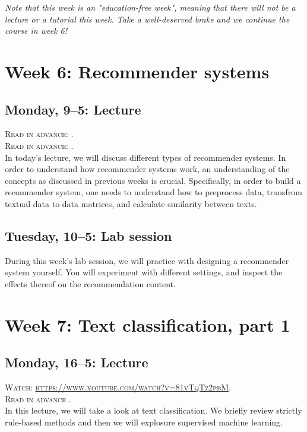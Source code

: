 \emph{Note that this week is an "education-free week", meaning that there will not be a lecture or a tutorial this week. Take a well-deserved brake and we continue the course in week 6!}

\section*{Week 6: Recommender systems}

\subsection*{Monday, 9--5: Lecture}
\textsc{ Read in advance: \cite{Moller2018}.}\\
\textsc{ Read in advance: \cite{Loecherbach2020}.}\\

In today's lecture, we will discuss different types of recommender systems. In order to understand how recommender systems work, an understanding of the concepts as discussed in previous weeks is crucial. Specifically, in order to build a recommender system, one needs to understand how to preprocess data, transfrom textual data to data matrices, and calculate similarity between texts. 

\subsection*{Tuesday, 10--5: Lab session}
During this week's lab session, we will practice with designing a recommender system yourself. You will experiment with different settings, and inspect the effects thereof on the recommendation content. 

\section*{Week 7: Text classification, part 1}
\subsection*{Monday, 16--5: Lecture}
\textsc{ Watch: \url{https://www.youtube.com/watch?v=81vTqTz2pbM}.}\\
\textsc{ Read in advance \cite{van_zoonen_social_2016}.}\\

In this lecture, we will take a look at text classification. We briefly review strictly rule-based methods and then we will explosure supervised machine learning.


